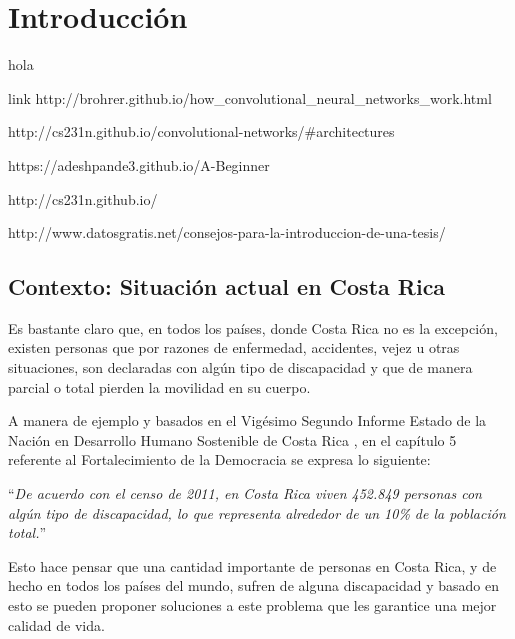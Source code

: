 
\chapter{Introducción}
\label{chp:intro}


hola

link http://brohrer.github.io/how_convolutional_neural_networks_work.html

http://cs231n.github.io/convolutional-networks/#architectures


https://adeshpande3.github.io/A-Beginner%



http://cs231n.github.io/

http://www.datosgratis.net/consejos-para-la-introduccion-de-una-tesis/



\section{Contexto: Situación actual en Costa Rica}
Es bastante claro que, en todos los países, donde Costa Rica no es la excepción, existen personas que por razones de 
enfermedad, accidentes, vejez u otras situaciones, son declaradas con algún tipo de discapacidad y que de
manera parcial o total pierden la movilidad en su cuerpo. 

A manera de ejemplo y basados en el Vigésimo Segundo Informe Estado de la Nación en Desarrollo Humano Sostenible de 
Costa Rica \cite{estadonacion1}, en el capítulo 5 referente al Fortalecimiento de la Democracia se expresa lo siguiente: 

\begin{center}
“\textit{De acuerdo con el censo de 2011, en Costa Rica viven 452.849 personas con algún tipo de discapacidad, lo que
representa alrededor de un 10\% de la población total.}”

\end{center}
Esto hace pensar que una cantidad importante de personas en Costa Rica, y de hecho en todos los países del mundo, 
sufren de alguna discapacidad y basado en esto se pueden proponer soluciones a este problema que les garantice 
una mejor calidad de vida. 



